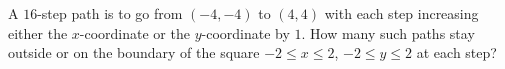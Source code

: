 A $16$-step path is to go from $(-4,-4)$ to $(4,4)$ with each step increasing either the $x$-coordinate or the $y$-coordinate by $1$. How many such paths stay outside or on the boundary of the square $-2\le x\le2$, $-2\le y\le2$ at each step?
